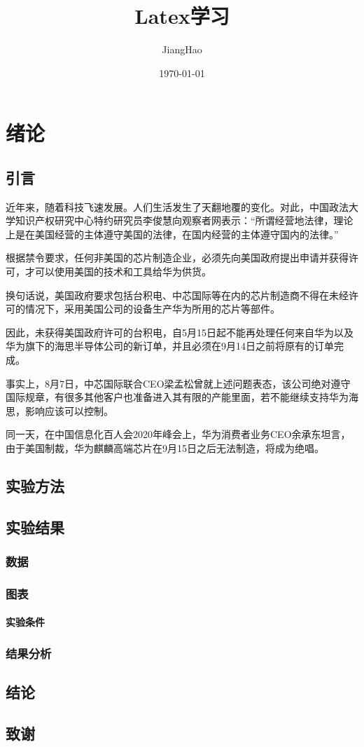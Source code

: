 \documentclass[UTF8]{ctexbook}
\title{ Latex学习}
\author{JiangHao}
\date{\today}
\begin{document}
    \chapter{绪论}
    \section{引言}
    近年来，随着科技飞速发展。人们生活发生了天翻地覆的变化。对此，中国政法大学知识产权研究中心特约研究员李俊慧向观察者网表示：“所谓经营地法律，理论上是在美国经营的主体遵守美国的法律，在国内经营的主体遵守国内的法律。”

    根据禁令要求，任何非美国的芯片制造企业，必须先向美国政府提出申请并获得许可，才可以使用美国的技术和工具给华为供货。

换句话说，美国政府要求包括台积电、中芯国际等在内的芯片制造商不得在未经许可的情况下，采用美国公司的设备生产华为所用的芯片等部件。

因此，未获得美国政府许可的台积电，自5月15日起不能再处理任何来自华为以及华为旗下的海思半导体公司的新订单，并且必须在9月14日之前将原有的订单完成。

事实上，8月7日，中芯国际联合CEO梁孟松曾就上述问题表态，该公司绝对遵守国际规章，有很多其他客户也准备进入其有限的产能里面，若不能继续支持华为海思，影响应该可以控制。

同一天，在中国信息化百人会2020年峰会上，华为消费者业务CEO余承东坦言，由于美国制裁，华为麒麟高端芯片在9月15日之后无法制造，将成为绝唱。
    \section{实验方法}
    \section{实验结果}
    \subsection{数据}
    \subsection{图表}
    \subsubsection{实验条件} %
    \subsection{结果分析}
    \section{结论}
    \section{致谢}
\end{document}
